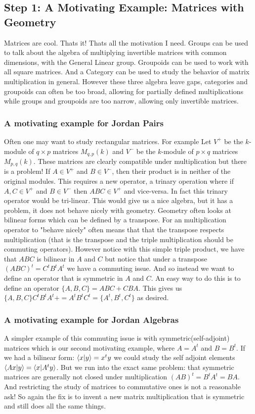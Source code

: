\subsection{Step 1: A Motivating Example: Matrices with Geometry}
Matrices are cool. Thats it! Thats all the motivation I need.
Groups can be used to talk about the algebra of multiplying 
invertible matrices with common dimensions, with the General Linear group.
Groupoids can be used to work with all square matrices. And a Category can be 
used to study the behavior of matrix multiplication in general. However these 
three algebra leave gaps, categories and groupoids can often be too broad, allowing
for partially defined multiplications while groups and groupoids are too narrow, allowing only 
invertible matrices.

\subsubsection*{A motivating example for Jordan Pairs}
Often one may want to study rectangular matrices. For example Let $V^+$ be the 
$k$-module of $q\times p$ matrices $M_{q,p}(k)$ and $V^-$ be the 
$k$-module of $p\times q$ matrices $M_{p,q}(k)$. These matrices are clearly compatible under 
multiplication but there is a problem! If $A\in V^+$ and $B\in V^-$, then their product is in neither
of the original modules. This requires a new operator, a trinary operation where if $A,C\in V^+$ and $B\in V^-$
then $ABC\in V^+$ and vice-versa. In fact this trinary operator would be tri-linear.
This would give us a nice algebra, but it has a problem, it does not behave nicely with geometry.
Geometry often looks at bilinear forms which can be defined by a transpose. For an multiplication operator to
"behave nicely" often means that that the transpose respects multiplication (that is the transpose and the 
triple multiplication should be commuting operators).
However notice with this simple triple product, we have that $ABC$ is bilinear in $A$ and $C$ but notice that 
under a transpose $(ABC)^t=C^tB^tA^t$ we have a commuting issue. And so instead we want to define an operator
that is symmetric in $A$ and $C$. An easy way to do this is to define an operator $\{A,B,C\}=ABC+CBA$. This gives us
$\{A,B,C\}C^tB^tA^t+=A^tB^tC^t=\{A^t,B^t,C^t\}$ as desired.

\subsubsection*{A motivating example for Jordan Algebras}
\label{sec:symmats}
A simpler example of this commuting issue is with symmetric(self-adjoint) matrices which is our second motivating example, where $A=A^t$ and $B=B^t$. 
If we had a bilinear form: $\left\langle x|y \right\rangle=x^ty$ we could study the self adjoint elements $\left\langle Ax|y \right\rangle=\left\langle x|A^ty \right\rangle$. 
But we run into the exact same problem: that symmetric matrices are generally not closed under multiplication
$(AB)^t=B^tA^t=BA$. And restricting the study of matrices to commutative ones is not a reasonable ask! 
So again the fix is to invent a new matrix multiplication that is symmetric and still does all the same things.
